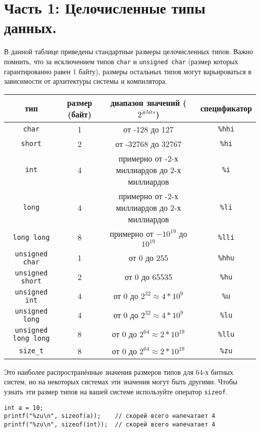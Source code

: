 \documentclass{article}
\begin{document}
\section*{Часть 1: Целочисленные типы данных.}
В данной таблице приведены стандартные размеры целочисленных типов. Важно помнить, что за исключением типов \texttt{char} и \texttt{unsigned char} (размер которых гарантированно равен 1 байту), размеры остальных типов могут варьироваться в зависимости от архитектуры системы и компилятора.
\begin{center}
\begin{tabular}{ c c c c }
 тип & размер (байт) & диапазон значений ($2^{\# bits}$) & спецификатор \\ \hline
 \texttt{char} & 1 & от -128 до 127 & \texttt{\%hhi} \\ 
 \texttt{short} & 2 & от -32768 до 32767 & \texttt{\%hi}  \\  
 \texttt{int} & 4 & примерно от -2-х миллиардов до 2-х миллиардов & \texttt{\%i}  \\  
 \texttt{long} & 4 & примерно от -2-х миллиардов до 2-х миллиардов & \texttt{\%li}  \\  
 \texttt{long long} & 8 & примерно от $-10^{19}$ до $10^{19}$ & \texttt{\%lli}  \\  
 \texttt{unsigned char} & 1 & от 0 до 255 & \texttt{\%hhu} \\ 
 \texttt{unsigned short} & 2 & от 0 до 65535 & \texttt{\%hu}  \\  
 \texttt{unsigned int} & 4 & от 0 до $2^{32} \approx 4*10^{9}$ & \texttt{\%u}  \\  
 \texttt{unsigned long} & 4 & от 0 до $2^{32} \approx 4*10^{9}$ & \texttt{\%lu}  \\  
 \texttt{unsigned long long} & 8 & от 0 до $2^{64} \approx 2*10^{19}$  & \texttt{\%llu}  \\  
 \texttt{size\_t} & 8 & от 0 до $2^{64} \approx 2*10^{19}$ & \texttt{\%zu} \\ \hline
\end{tabular}
\end{center}
Это наиболее распространённые значения размеров типов для 64-х битных систем, но на некоторых системах эти значения могут быть другими.
Чтобы узнать эти размер типов на вашей системе используйте оператор \texttt{sizeof}. 
\begin{lstlisting}
int a = 10;
printf("%zu\n", sizeof(a));    // скорей всего напечатает 4
printf("%zu\n", sizeof(int));  // скорей всего напечатает 4
\end{lstlisting}
\end{document}
